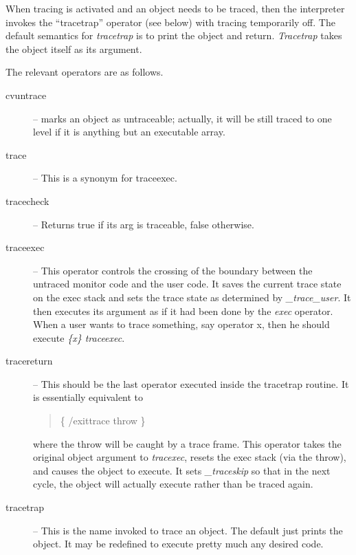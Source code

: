 When tracing is activated and an object needs to be traced,
then the interpreter invokes the ``tracetrap'' operator
(see below) with tracing temporarily off.
The default semantics for {\em tracetrap} is to
print the object and return.
{\em Tracetrap} takes the object itself as its argument.

The relevant operators are as follows.
\begin{description}
\item[cvuntrace]
-- marks an object as untraceable; actually, it will be still traced
to one level if it is anything but an executable array.
\item[trace]
-- This is a synonym for traceexec.
\item[tracecheck]
-- Returns true if its arg is traceable, false otherwise.
\item[traceexec]
-- This operator controls the crossing of the boundary between
the untraced monitor code and the user code.
It saves the current trace state on the exec stack
and sets the trace state as determined by {\em \_trace\_user}.
It then executes its argument as if it had been done
by the {\em exec} operator.
When a user wants to trace something, say operator x,
then he should execute {\em \{x\} traceexec}.
\item[tracereturn]
-- This should be the last operator executed inside the tracetrap
routine.
It is essentially equivalent to
\begin{quote}
\{ /exittrace throw \}
\end{quote}
where the throw will be caught by a trace frame.
This operator takes the original object argument to {\em tracexec},
resets the exec stack (via the throw), and causes the object to execute.
It sets {\em \_traceskip} so that in the next cycle,
the object will actually execute rather than be traced again.
\item[tracetrap]
-- This is the name invoked to trace an object.
The default just prints the object.
It may be redefined to execute pretty much any desired code.
\end{description}

